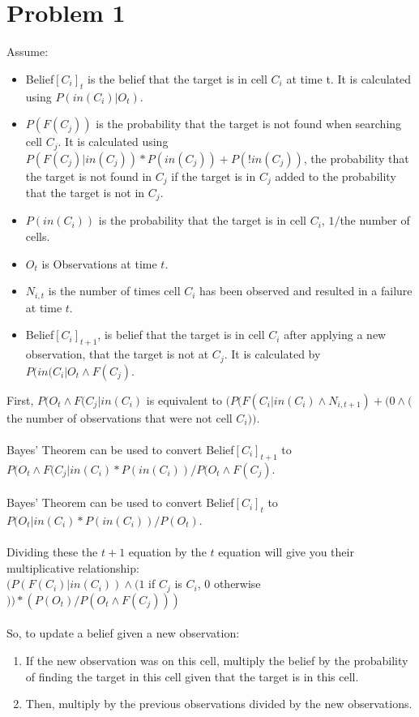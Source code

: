 \documentclass[12pt]{report}
\begin{document}
\section{Problem 1}
Assume:\begin{itemize}
	\item Belief$[C_{i}]_{t}$ is the belief that the target is in cell $C_{i}$ at time {t}. It is calculated using $P(in(C_{i})|O_{t})$.
	\item $P(F(C_{j}))$ is the probability that the target is not found when searching cell $C_{j}$. 
		It is calculated using $P(F(C_{j})|in(C_{j}))*P(in(C_{j}))+P(!in(C_{j}))$, the probability that the target is 
		not found in $C_{j}$ if the target is in $C_{j}$ added to the probability that the target is not in $C_{j}$.
	\item $P(in(C_{i}))$ is the probability that the target is in cell $C_{i}$, $1/$the number of cells.
	\item $O_{t}$ is Observations at time $t$.
	\item $N_{i,t}$ is the number of times cell $C_{i}$ has been observed and resulted in a failure at time $t$.
	\item Belief$[C_{i}]_{t+1}$, is belief that the target is in cell $C_{i}$ after applying a new observation, that the target is not at $C_{j}$. It is calculated by $P(in(C_{i}|O_{t}\land F(C_{j})$.
\end{itemize}
First, $P(O_{t}\land F(C_{j}|in(C_{i})$ is equivalent to $(P(F(C_{i}|in(C_{i})\wedge N_{i,t+1})+(0\wedge($the number of observations that were not cell $C_{i}))$.\\
\\
Bayes' Theorem can be used to convert Belief$[C_{i}]_{t+1}$ to\\
$P(O_{t}\land F(C_{j}|in(C_{i})*P(in(C_{i}))/P(O_{t}\land F(C_{j})$.\\
\\
Bayes' Theorem can be used to convert Belief$[C_{i}]_{t}$ to\\
$P(O_{t}|in(C_{i})*P(in(C_{i}))/P(O_{t})$.\\
\\
Dividing these the $t+1$ equation by the $t$ equation will give you their multiplicative relationship:\\
$(P(F(C_{i})|in(C_{i}))\wedge (1$ if $C_{j}$ is $C_{i}$, $0$ otherwise$))*(P(O_{t})/P(O_{t}\land F(C_{j})))$\\
\\
So, to update a belief given a new observation:
\begin{enumerate}
	\item If the new observation was on this cell, multiply the belief by the probability of finding the target in this cell given that the target is in this cell.
	\item Then, multiply by the previous observations divided by the new observations.
\end{enumerate}
\end{document}
